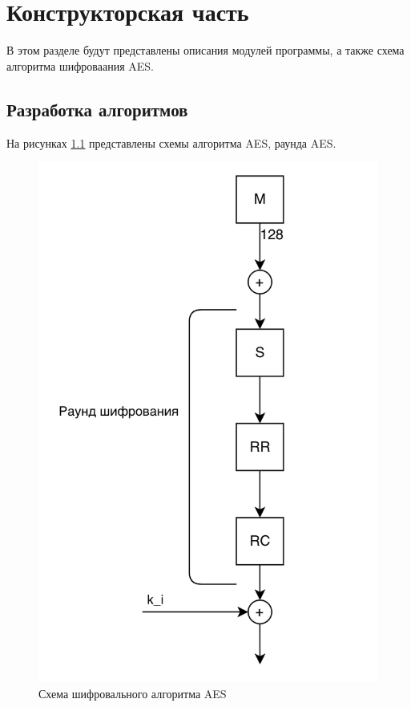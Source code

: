 \chapter{Конструкторская часть}

В этом разделе будут представлены описания модулей программы, а также схема алгоритма шифроваания AES.

\section{Разработка алгоритмов}

На рисунках \ref{img:aes} представлены схемы алгоритма AES, раунда AES.

\begin{figure}[ht!]
	\centering
	\includegraphics[width=0.6\linewidth]{img/aes.png}
	\caption{Схема шифровального алгоритма AES}
	\label{img:aes}
\end{figure}

